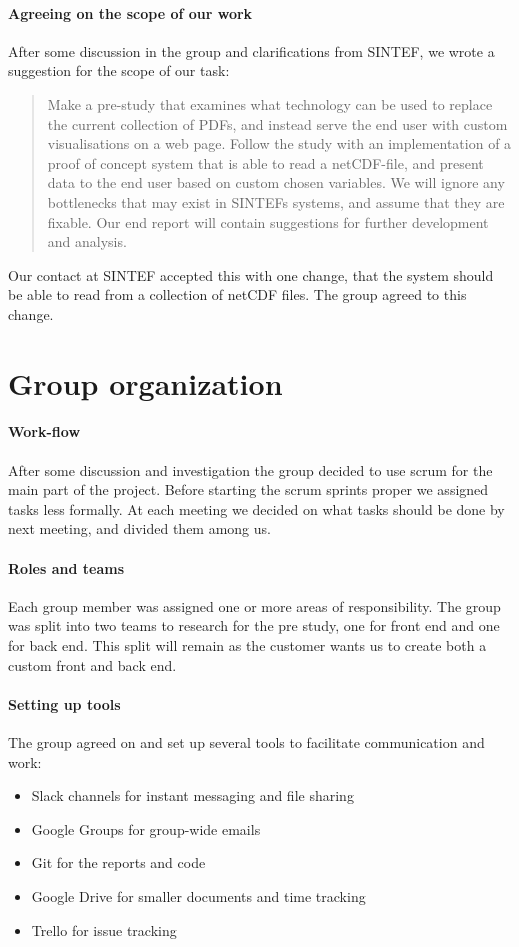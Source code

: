 \documentclass[11pt,a4paper,titlepage,oneside]{report}
\begin{document}
\paragraph{Agreeing on the scope of our work}
After some discussion in the group and clarifications from SINTEF, we wrote a suggestion for the scope of our task: 
\begin{quote} Make a pre-study that examines what technology can be used to replace the current collection of PDFs, and instead serve the end user with custom visualisations on a web page. Follow the study with an implementation of a proof of concept system that is able to read a netCDF-file, and present data to the end user based on custom chosen variables. We will ignore any bottlenecks that may exist in SINTEFs systems, and assume that they are fixable. Our end report will contain suggestions for further development and analysis.
\end{quote}
Our contact at SINTEF accepted this with one change, that the system should be able to read from a collection of netCDF files. The group agreed to this change.

\section{Group organization}
\paragraph{Work-flow}
After some discussion and investigation the group decided to use scrum for the main part of the project. Before starting the scrum sprints proper we assigned tasks less formally. At each meeting we decided on what tasks should be done by next meeting, and divided them among us.

\paragraph{Roles and teams}
Each group member was assigned one or more areas of responsibility. The group was split into two teams to research for the pre study, one for front end and one for back end. This split will remain as the customer wants us to create both a custom front and back end.

\paragraph{Setting up tools}
The group agreed on and set up several tools to facilitate communication and work:
\begin{itemize}
	\item Slack channels for instant messaging and file sharing
	\item Google Groups for group-wide emails
	\item Git for the reports and code
	\item Google Drive for smaller documents and time tracking
	\item Trello for issue tracking
\end{itemize}
\end{document}
